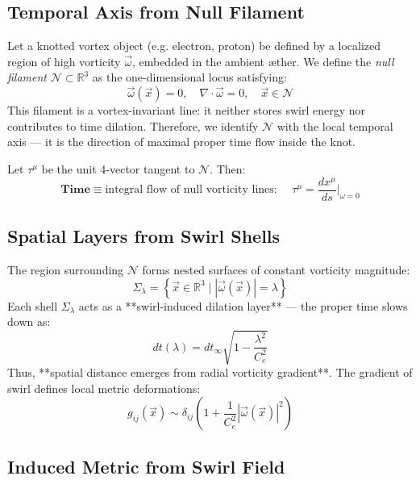 \subsection{Temporal Axis from Null Filament}
\label{subsec:null_filament_time}

Let a knotted vortex object (e.g. electron, proton) be defined by a localized region of high vorticity \( \vec{\omega} \), embedded in the ambient æther. We define the \textit{null filament} \( \mathcal{N} \subset \mathbb{R}^3 \) as the one-dimensional locus satisfying:
\begin{equation}
    \vec{\omega}(\vec{x}) = 0, \quad \nabla \cdot \vec{\omega} = 0, \quad \vec{x} \in \mathcal{N}
\end{equation}
This filament is a vortex-invariant line: it neither stores swirl energy nor contributes to time dilation. Therefore, we identify \( \mathcal{N} \) with the local temporal axis — it is the direction of maximal proper time flow inside the knot.

Let \( \tau^\mu \) be the unit 4-vector tangent to \( \mathcal{N} \). Then:
\begin{equation}
    \boxed{
        \textbf{Time} \equiv \text{integral flow of null vorticity lines: }
        \quad \tau^\mu = \frac{dx^\mu}{ds} \Big|_{\omega = 0}
    }
\end{equation}

\subsection{Spatial Layers from Swirl Shells}
\label{subsec:swirl_shells_space}

The region surrounding \( \mathcal{N} \) forms nested surfaces of constant vorticity magnitude:
\[
    \Sigma_\lambda = \left\{ \vec{x} \in \mathbb{R}^3 \mid |\vec{\omega}(\vec{x})| = \lambda \right\}
\]
Each shell \( \Sigma_\lambda \) acts as a **swirl-induced dilation layer** — the proper time slows down as:
\[
    dt(\lambda) = dt_\infty \sqrt{1 - \frac{\lambda^2}{C_e^2}}
\]
Thus, **spatial distance emerges from radial vorticity gradient**. The gradient of swirl defines local metric deformations:
\begin{equation}
    g_{ij}(\vec{x}) \sim \delta_{ij} \left( 1 + \frac{1}{C_e^2} |\vec{\omega}(\vec{x})|^2 \right)
\end{equation}

\subsection{Induced Metric from Swirl Field}
\label{subsec:induced_metric}

